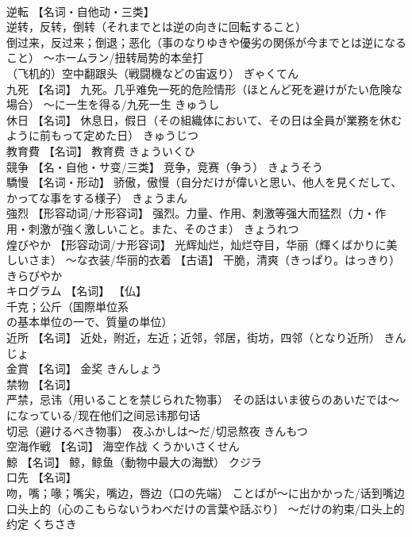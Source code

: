 \documentclass[8pt]{extreport}
\begin{document}
\begin{CJK}{UTF8}{min}
\\	逆転	【名词・自他动・三类】 
\\	逆转，反转，倒转（それまでとは逆の向きに回転すること） 
\\	倒过来，反过来；倒退；恶化（事のなりゆきや優劣の関係が今までとは逆になること） ～ホームラン/扭转局势的本垒打 
\\	（飞机的）空中翻跟头（戦闘機などの宙返り）	ぎゃくてん	
\\	九死	【名词】 九死。几乎难免一死的危险情形（ほとんど死を避けがたい危険な場合） ～に一生を得る/九死一生	きゅうし	
\\	休日	【名词】 休息日，假日（その組織体において、その日は全員が業務を休むように前もって定めた日）	きゅうじつ	
\\	教育費	【名词】 教育费	きょういくひ	
\\	競争	【名・自他・サ变/三类】 竞争，竞赛（争う）	きょうそう	
\\	驕慢	【名词・形动】 骄傲，傲慢（自分だけが偉いと思い、他人を見くだして、かってな事をする様子）	きょうまん	
\\	強烈	【形容动词/ナ形容词】 强烈。力量、作用、刺激等强大而猛烈（力・作用・刺激が強く激しいこと。また、そのさま）	きょうれつ	
\\	煌びやか	【形容动词/ナ形容词】 光辉灿烂，灿烂夺目，华丽（輝くばかりに美しいさま） ～な衣装/华丽的衣着 【古语】 干脆，清爽（きっぱり。はっきり）	きらびやか	
\\	キログラム	【名词】 【仏】
\\	千克；公斤（国際単位系
\\	の基本単位の一で、質量の単位）		
\\	近所	【名词】 近处，附近，左近；近邻，邻居，街坊，四邻（となり近所）	きんじょ	
\\	金賞	【名词】 金奖	きんしょう	
\\	禁物	【名词】 
\\	严禁，忌讳（用いることを禁じられた物事） その話はいま彼らのあいだでは～になっている/现在他们之间忌讳那句话 
\\	切忌（避けるべき物事） 夜ふかしは～だ/切忌熬夜	きんもつ	
\\	空海作戦	【名词】 海空作战	くうかいさくせん	
\\	鯨	【名词】 鲸，鲸鱼（動物中最大の海獣）	クジラ	
\\	口先	【名词】 
\\	吻，嘴；喙；嘴尖，嘴边，唇边（口の先端） ことばが～に出かかった/话到嘴边 
\\	口头上的（心のこもらないうわべだけの言葉や話ぶり〕 ～だけの約束/口头上的约定	くちさき	

\end{CJK}
\end{document}
